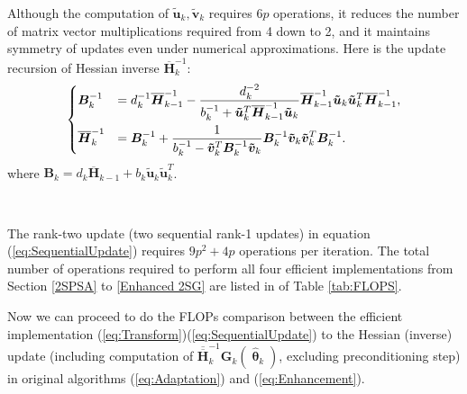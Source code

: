 \documentclass[conference,10.3cpt]{IEEEtran}
\newcommand{\bG}{\bm{G}}
\newcommand{\oH}{\bm{\overline{H}}}
\newcommand{\ooH}{\bm{\overline{\overline{H}}}}
\newcommand{\htheta}{\bm{\hat{\uptheta}}}
\begin{document}
Although the computation of $\bm{\tilde{u}}_k,
\bm{\tilde{v}}_k$ requires $6p$ operations, it reduces the number of
matrix vector multiplications required from 4 down to 2, and it
maintains symmetry of updates even under numerical approximations. Here is the update recursion of Hessian inverse $\oH_k^{-1}$:
\begin{equation} \label{eq:SequentialUpdate}
  \begin{dcases} \bm{B}_k^{-1} &= d_k^{-1}\oH_{k-1}^{-1}
    -
    \frac{d_k^{-2}}{b_k^{-1}+\bm{\tilde{u}}_k^{T}\oH_{k-1}^{-1}\bm{\tilde{u}}_k}
    \oH_{k-1}^{-1}\bm{\tilde{u}}_k \bm{\tilde{u}}_k^{T}\oH_{k-1}^{-1},\\
    \oH_k^{-1} &=\bm{B}_k^{-1} +
    \frac{1}{b_k^{-1}-\bm{\tilde{v}}_k^{T}\bm{B}_k^{-1}\bm{\tilde{v}}_k}
    \bm{B}_k^{-1}\bm{\tilde{v}}_k \bm{\tilde{v}}_k^{T}\bm{B}_{k}^{-1}.
  \end{dcases}
\end{equation}
where $\bm{B}_k=d_k\oH_{k-1}+b_k\bm{\tilde{u}}_k  \bm{\tilde{u}}_k^{T}$.

\begin{table} [!hbp] \centering 
	\\[2pt]
		\caption{FLOPS Required in Eq. (\ref{eq:Transform})\text{--}(\ref{eq:SequentialUpdate})  }
		\label{tab:FLOPS}
	\end{table}

The rank-two update (two sequential rank-1 updates) in
equation (\ref{eq:SequentialUpdate}) requires $9p^2 + 4p$ operations
per iteration. The total number of operations required to perform all four
efficient implementations from Section \ref{2SPSA} to \ref{Enhanced
  2SG} are listed in of Table \ref{tab:FLOPS}.


Now we can proceed to do the FLOPs comparison between the efficient implementation (\ref{eq:Transform})\text{--}(\ref{eq:SequentialUpdate}) to the Hessian (inverse) update (including computation of $\ooH_k^{-1} \bG_k(\htheta_k)$, excluding preconditioning step) in original algorithms (\ref{eq:Adaptation}) and (\ref{eq:Enhancement}).
\end{document}
